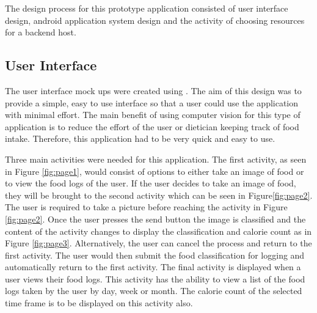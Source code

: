 The design process for this prototype application consisted of user interface design, android application system design and the activity of choosing resources for a backend host.

\subsection*{User Interface}
The user interface mock ups were created using \textcite{fluid}.
The aim of this design was to provide a simple, easy to use interface so that a user could use the application with minimal effort.
The main benefit of using computer vision for this type of application is to
reduce the effort of the user or dietician keeping track of food intake.
Therefore, this application had to be very quick and easy to use.

Three main activities were needed for this application.
The first activity, as seen in Figure \ref{fig:page1}, would consist of options to either take an image of food or to view the food logs of the user.
If the user decides to take an image of food, they will be brought to the second activity which can be seen in Figure\ref{fig:page2}.
The user is required to take a picture before reaching the activity in Figure \ref{fig:page2}.
Once the user presses the send button the image is classified and the content of the activity changes to display the classification and calorie count as in Figure \ref{fig:page3}.
Alternatively, the user can cancel the process and return to the first activity.
The user would then submit the food classification for logging and automatically return to the first activity.
The final activity is displayed when a user views their food logs.
This activity has the ability to view a list of the food logs taken by the user by day, week or month.
The calorie count of the selected time frame is to be displayed on this activity also.

